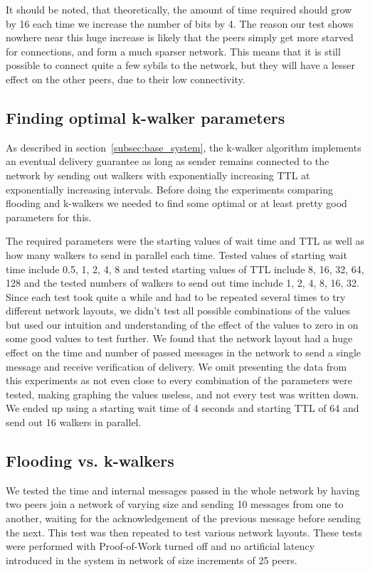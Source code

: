 It should be noted, that theoretically, the amount of time required should grow by 16 each time we increase the number of bits by 4. The reason our test shows nowhere near this huge increase is likely that the peers simply get more starved for connections, and form a much sparser network. This means that it is still possible to connect quite a few sybils to the network, but they will have a lesser effect on the other peers, due to their low connectivity.

\subsection{Finding optimal k-walker parameters}
As described in section~\ref{subsec:base_system}, the k-walker algorithm implements an eventual delivery guarantee as long as sender remains connected to the network by sending out walkers with exponentially increasing TTL at exponentially increasing intervals. Before doing the experiments comparing flooding and k-walkers we needed to find some optimal or at least pretty good parameters for this.

The required parameters were the starting values of wait time and TTL as well as how many walkers to send in parallel each time. Tested values of starting wait time include 0.5, 1, 2, 4, 8 and tested starting values of TTL include 8, 16, 32, 64, 128 and the tested numbers of walkers to send out time include 1, 2, 4, 8, 16, 32. Since each test took quite a while and had to be repeated several times to try different network layouts, we didn't test all possible combinations of the values but used our intuition and understanding of the effect of the values to zero in on some good values to test further. We found that the network layout had a huge effect on the time and number of passed messages in the network to send a single message and receive verification of delivery. We omit presenting the data from this experiments as not even close to every combination of the parameters were tested, making graphing the values useless, and not every test was written down. We ended up using a starting wait time of 4 seconds and starting TTL of 64 and send out 16 walkers in parallel.

\subsection{Flooding vs. k-walkers}
We tested the time and internal messages passed in the whole network by having two peers join a network of varying size and sending 10 messages from one to another, waiting for the acknowledgement of the previous message before sending the next. This test was then repeated to test various network layouts. These tests were performed with Proof-of-Work turned off and no artificial latency introduced in the system in network of size increments of 25 peers.

